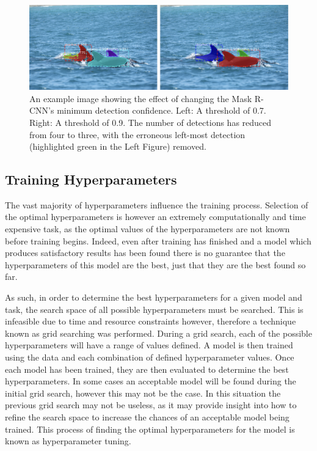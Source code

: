 \begin{figure}[h]
	\begin{center}
		\includegraphics[scale=0.55]{Chapter3/figs/min-conf-eg.png}
	\end{center}
	\caption[An example image showing the effect of changing the Mask R-CNN's minimum detection confidence.]{An example image showing the effect of changing the Mask R-CNN's minimum detection confidence. Left: A threshold of 0.7. Right: A threshold of 0.9. The number of detections has reduced from four to three, with the erroneous left-most detection (highlighted green in the Left Figure) removed.}
	\label{fig:min-conf}
\end{figure}
 
 
\subsection{Training Hyperparameters}\label{ch:cetDet,sec:ModelSelection,sub:TrainingHyperparameters}

The vast majority of hyperparameters influence the training process. Selection of the optimal hyperparameters is however an extremely computationally and time expensive task, as the optimal values of the hyperparameters are not known before training begins. Indeed, even after training has finished and a model which produces satisfactory results has been found there is no guarantee that the hyperparameters of this model are the best, just that they are the best found so far. 

As such, in order to determine the best hyperparameters for a given model and task, the search space of all possible hyperparameters must be searched. This is infeasible due to time and resource constraints however,  therefore a technique known as grid searching was performed. During a grid search, each of the possible hyperparameters will have a range of values defined. A model is then trained using the data and each combination of defined hyperparameter values. Once each model has been trained, they are then evaluated to determine the best hyperparameters. In some cases an acceptable model will be found during the initial grid search, however this may not be the case. In this situation the previous grid search may not be useless, as it may provide insight into how to refine the search space to increase the chances of an acceptable model being trained. This process of finding the optimal hyperparameters for the model is known as hyperparameter tuning. 

